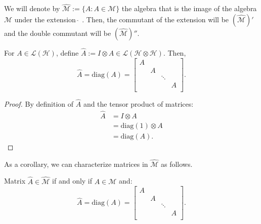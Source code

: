 We will denote by $\widehat{\mathcal{M}} := \{\widehat{A}: A \in \mathcal{M}\}$ the algebra that is the image of the algebra $\mathcal{M}$ under the extension $\widehat{\: }$ . Then, the commutant of the extension will be $(\widehat{\mathcal{M}})'$ and the double commutant will be $(\widehat{\mathcal{M}})''$.

\begin{fact}
\label{fact-A-diag}
    For $A \in \mathcal{L}(\mathcal{H})$, define $\widehat{A} := I \otimes A \in \mathcal{L}(\mathcal{H} \otimes \mathcal{H})$. Then,
    \begin{equation}
        \widehat{A} = \text{diag}(A) = 
    \begin{bmatrix}
    A & \\
    & A \\
    & & \ddots\\
    & & & A\\
    \end{bmatrix}.
    \end{equation}
\end{fact}
\begin{proof}
    By definition of $\widehat{A}$ and the tensor product of matrices:
    \begin{align*}
        \widehat{A} &= I \otimes A\\
        &= \text{diag}(1) \otimes A \\
        &= \text{diag}(A).
    \end{align*}
\end{proof}
\noindent As a corollary, we can characterize matrices in $\widehat{\mathcal{M}}$ as follows.

\begin{claim}\label{claim-m-hat}
    Matrix $\widehat{A} \in \widehat{\mathcal{M}}$ if and only if $A \in \mathcal{M}$ and:
    \begin{equation}
        \widehat{A} = \text{diag}(A) = 
    \begin{bmatrix}
    A & \\
    & A \\
    & & \ddots\\
    & & & A\\
    \end{bmatrix}.
    \end{equation}
\end{claim}

